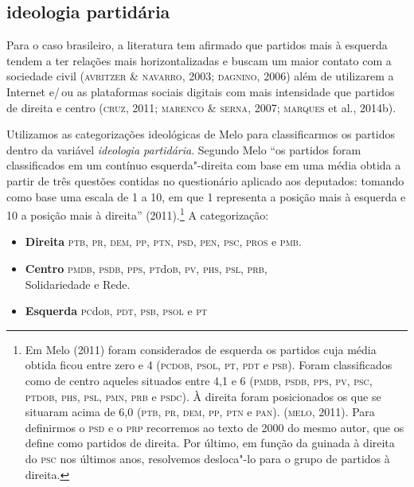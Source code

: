 \subsection{ideologia partidária}

Para o caso brasileiro, a literatura tem afirmado que partidos mais à
esquerda tendem a ter relações mais horizontalizadas e buscam um maior
contato com a sociedade civil (\textsc{avritzer \& navarro}, 2003; \textsc{dagnino}, 2006)
além de utilizarem a Internet e/\,ou as plataformas sociais digitais com
mais intensidade que partidos de direita e centro (\textsc{cruz}, 2011; \textsc{marenco
\& serna}, 2007; \textsc{marques} et al., 2014b).

Utilizamos as categorizações ideológicas de Melo para classificarmos os partidos dentro da variável \textit{ideologia
partidária}. Segundo Melo ``os partidos foram classificados em um
contínuo esquerda"-direita com base em uma média obtida a partir de três
questões contidas no questionário aplicado aos deputados: tomando como
base uma escala de 1 a 10, em que 1 representa a posição mais à esquerda
e 10 a posição mais à direita'' (2011).\footnote{Em Melo (2011) foram
  considerados de esquerda os partidos cuja média obtida ficou entre
  zero e 4 (\textsc{pcdob}, \textsc{psol}, \textsc{pt}, \textsc{pdt} e \textsc{psb}). Foram classificados como de
  centro aqueles situados entre 4,1 e 6 (\textsc{pmdb}, \textsc{psdb}, \textsc{pps}, \textsc{pv}, \textsc{psc},
  \textsc{ptdob}, \textsc{phs}, \textsc{psl}, \textsc{pmn}, \textsc{prb} e \textsc{psdc}). À direita foram posicionados os que
  se situaram acima de 6,0 (\textsc{ptb}, \textsc{pr}, \textsc{dem}, \textsc{pp}, \textsc{ptn} e \textsc{pan}). (\textsc{melo}, 2011).
  Para definirmos o \textsc{psd} e o \textsc{prp} recorremos ao texto de 2000 do mesmo
  autor, que os define como partidos de direita. Por último, em função
  da guinada à direita do \textsc{psc} nos últimos anos, resolvemos desloca"-lo
  para o grupo de partidos à direita.} A categorização:

\begin{itemize}
\item \textbf{Direita} \textsc{ptb, pr, dem, pp, ptn, psd, pen, psc, pros} e \textsc{pmb}.
\item \textbf{Centro} \textsc{pmdb, psdb, pps}, \textsc{pt}do\textsc{b}, \textsc{pv, phs, psl, prb},\\Solidariedade e Rede.
\item \textbf{Esquerda} \textsc{pc}do\textsc{b}, \textsc{pdt, psb, psol} e \textsc{pt} %
\end{itemize}

